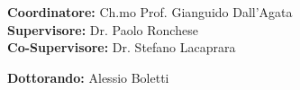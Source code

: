 \begin{titlepage}
  \vspace{0.6 cm}
  \begin{flushleft}
    \begin{minipage}{0.8\textwidth}
      \begin{flushleft} \large
        \textbf{Coordinatore:} Ch.mo Prof. Gianguido Dall'Agata\\
        \vspace{5mm}
        \textbf{Supervisore:} Dr. Paolo Ronchese\\
        \vspace{5mm}
        \textbf{Co-Supervisore:} Dr. Stefano Lacaprara\\
        \vspace{1cm} %
      \end{flushleft}
    \end{minipage}
  \end{flushleft}
  \vspace{0.4cm}
  \begin{flushright}
    \begin{minipage}{0.5\textwidth}
      \begin{flushright}
        \large \textbf{Dottorando:} Alessio Boletti\\
      \end{flushright}
    \end{minipage}
  \end{flushright}
\end{titlepage}
